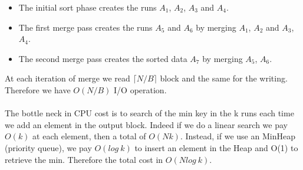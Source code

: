 \documentclass[a4paper]{article}
\begin{document}
\begin{itemize}
\item The initial sort phase creates the runs $A_1$, $A_2$, $A_3$ and $A_4$.
\item The first merge pass creates the runs $A_5$ and $A_6$ by merging $A_1$, $A_2$ and $A_3$,$A_4$.
\item The second merge pass creates the sorted data $A_7$ by merging $A_5$, $A_6$.
\end{itemize}
At each iteration of merge we read $\lceil N/B \rceil$ block and the same for the writing. Therefore we have $O(N/B)$ I/O operation.
\\
\\
The bottle neck in CPU cost is to search of the min key in the k runs each time we add an element in the output block. Indeed if we do a linear search we pay $O(k)$ at each element, then a total of $O(Nk)$. Instead, if we use an MinHeap (priority queue), we pay $O(log \ k)$ to insert an element in the Heap and O(1) to retrieve the min. Therefore the total cost in $O(N log \ k)$. 
\end{document}

